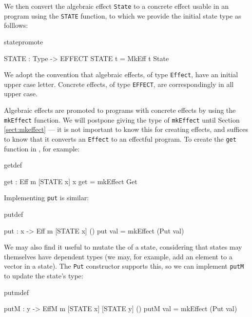We then convert the algebraic effect \texttt{State} to a concrete
effect usable in an \Eff{} program using the \texttt{STATE} function, to which
we provide the initial state type as folllows:

\begin{SaveVerbatim}{statepromote}

STATE : Type -> EFFECT
STATE t = MkEff t State

\end{SaveVerbatim}

\noindent
We adopt the convention that algebraic effects, of type \texttt{Effect},
have an initial upper case letter. Concrete effects, of type \texttt{EFFECT},
are correspondingly in all upper case.

Algebraic effects are promoted to \Eff{} programs with concrete effects
by using the
\texttt{mkEffect} function. We will postpone giving the type of
\texttt{mkEffect} until Section \ref{sect:mkeffect} --- it is not important to
know this for creating effects, and suffices to know that it converts an
\texttt{Effect} to an effectful program. To create the \texttt{get} function in
\Eff{}, for example:

\begin{SaveVerbatim}{getdef}

get : Eff m [STATE x] x
get = mkEffect Get 

\end{SaveVerbatim}

\noindent
Implementing \texttt{put} is similar:

\begin{SaveVerbatim}{putdef}

put : x -> Eff m [STATE x] ()
put val = mkEffect (Put val)

\end{SaveVerbatim}

\noindent
We may also find it useful to mutate the  of a state, considering
that states may themselves have dependent types (we may, for example, add
an element to a vector in a state). The \texttt{Put} constructor supports this,
so we can implement \texttt{putM} to update the state's type:

\begin{SaveVerbatim}{putmdef}

putM : y -> EffM m [STATE x] [STATE y] ()
putM val = mkEffect (Put val)

\end{SaveVerbatim}

